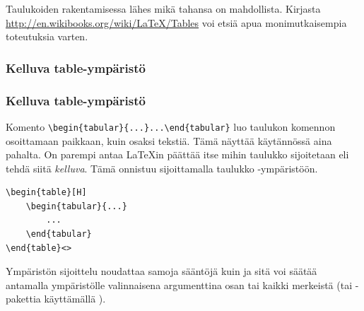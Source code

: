 \begin{fframe}
    Taulukoiden rakentamisessa lähes mikä tahansa on mahdollista. Kirjasta \url{http://en.wikibooks.org/wiki/LaTeX/Tables} voi etsiä apua monimutkaisempia toteutuksia varten.
\end{fframe}

%

\subsubsection{Kelluva table-ympäristö}
\begin{fframe}
    \frametitle{Kelluva table-ympäristö}
Komento \lstinline-\begin{tabular}{...}...\end{tabular}- luo taulukon komennon osoittamaan paikkaan, kuin osaksi tekstiä. Tämä näyttää käytännössä aina pahalta. 
    \pause
    \vaihto
    On parempi antaa \LaTeX in päättää itse mihin taulukko sijoitetaan eli tehdä siitä \emph{kelluva}. Tämä onnistuu sijoittamalla taulukko -ympäristöön.
    \begin{lstlisting}
\begin{table}[H]
    \begin{tabular}{...}
        ...
    \end{tabular}
\end{table}<>
    \end{lstlisting}
    \pause
    Ympäristön  sijoittelu noudattaa samoja sääntöjä kuin  ja sitä voi säätää antamalla ympäristölle valinnaisena argumenttina osan tai kaikki merkeistä  (tai -pakettia käyttämällä ).
\end{fframe}

